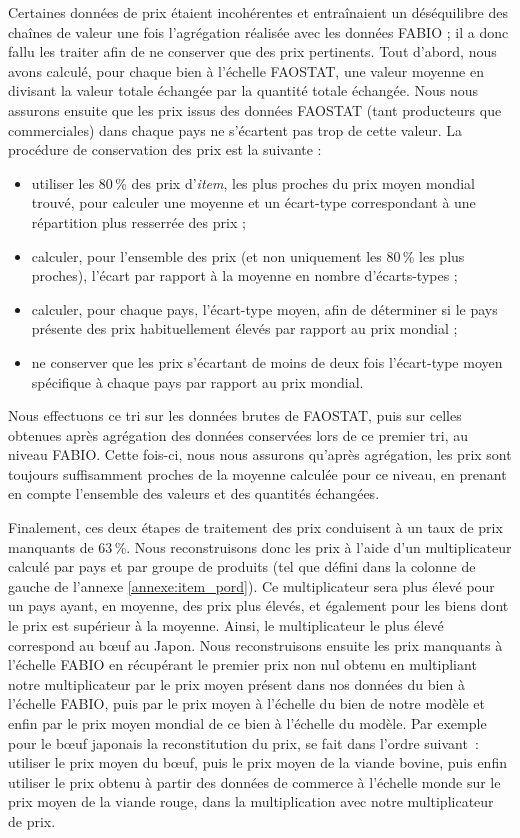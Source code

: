 Certaines données de prix étaient incohérentes et entraînaient un déséquilibre des chaînes de valeur une fois l'agrégation réalisée avec les données FABIO ; il a donc fallu les traiter afin de ne conserver que des prix pertinents. Tout d'abord, nous avons calculé, pour chaque bien à l'échelle FAOSTAT, une valeur moyenne en divisant la valeur totale échangée par la quantité totale échangée. Nous nous assurons ensuite que les prix issus des données FAOSTAT (tant producteurs que commerciales) dans chaque pays ne s'écartent pas trop de cette valeur. La procédure de conservation des prix est la suivante :
\begin{itemize}
    \item utiliser les 80\,\% des prix d'\textit{item}, les plus proches du prix moyen mondial trouvé, pour calculer une moyenne et un écart-type correspondant à une répartition plus resserrée des prix ;
    \item calculer, pour l'ensemble des prix (et non uniquement les 80\,\% les plus proches), l'écart par rapport à la moyenne en nombre d’écarts-types ;
    \item calculer, pour chaque pays, l'écart-type moyen, afin de déterminer si le pays présente des prix habituellement élevés par rapport au prix mondial ;
    \item ne conserver que les prix s'écartant de moins de deux fois l'écart-type moyen spécifique à chaque pays par rapport au prix mondial.
\end{itemize}
Nous effectuons ce tri sur les données brutes de FAOSTAT, puis sur celles obtenues après agrégation des données conservées lors de ce premier tri, au niveau FABIO. Cette fois-ci, nous nous assurons qu'après agrégation, les prix sont toujours suffisamment proches de la moyenne calculée pour ce niveau, en prenant en compte l'ensemble des valeurs et des quantités échangées.

Finalement, ces deux étapes de traitement des prix conduisent à un taux de prix manquants de 63\,\%. Nous reconstruisons donc les prix à l'aide d'un multiplicateur calculé par pays et par groupe de produits (tel que défini dans la colonne de gauche de l'annexe \ref{annexe:item_pord}). Ce multiplicateur sera plus élevé pour un pays ayant, en moyenne, des prix plus élevés, et également pour les biens dont le prix est supérieur à la moyenne. Ainsi, le multiplicateur le plus élevé correspond au bœuf au Japon. Nous reconstruisons ensuite les prix manquants à l'échelle FABIO en récupérant le premier prix non nul obtenu en multipliant notre multiplicateur par le prix moyen présent dans nos données du bien à l'échelle FABIO, puis par le prix moyen à l'échelle du bien de notre modèle et enfin par le prix moyen mondial de ce bien à l'échelle du modèle. Par exemple pour le bœuf japonais la reconstitution du prix, se fait dans l'ordre suivant~: utiliser le prix moyen du bœuf, puis le prix moyen de la viande bovine, puis enfin utiliser le prix obtenu à partir des données de commerce à l'échelle monde sur le prix moyen de la viande rouge, dans la multiplication avec notre multiplicateur de prix.


